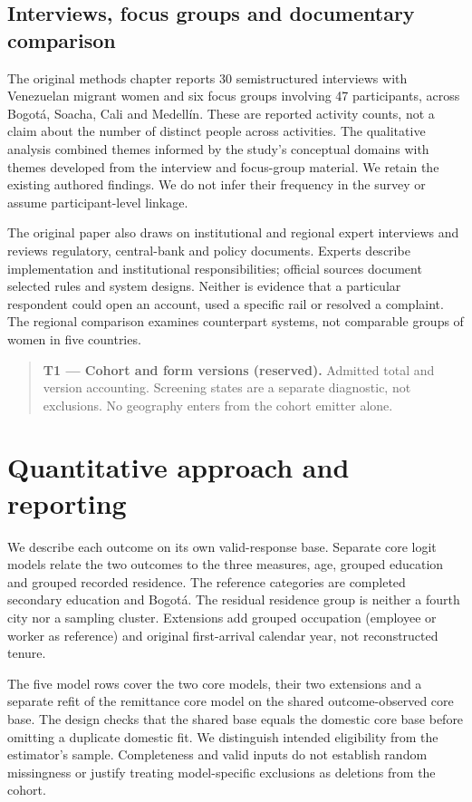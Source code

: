 \documentclass[12pt]{article}
\newcommand{\exhibitplaceholder}[3]{%
  \begin{quote}\small
    \textbf{#1 --- #2 (reserved).} #3
  \end{quote}%
}
\begin{document}
\subsection{Interviews, focus groups and documentary comparison}

The original methods chapter reports 30 semistructured interviews with Venezuelan migrant women and six focus groups involving 47 participants, across Bogotá, Soacha, Cali and Medellín. These are reported activity counts, not a claim about the number of distinct people across activities. The qualitative analysis combined themes informed by the study's conceptual domains with themes developed from the interview and focus-group material. We retain the existing authored findings. We do not infer their frequency in the survey or assume participant-level linkage.

The original paper also draws on institutional and regional expert interviews and reviews regulatory, central-bank and policy documents. Experts describe implementation and institutional responsibilities; official sources document selected rules and system designs. Neither is evidence that a particular respondent could open an account, used a specific rail or resolved a complaint. The regional comparison examines counterpart systems, not comparable groups of women in five countries.

\exhibitplaceholder{T1}{Cohort and form versions}{Admitted total and version accounting. Screening states are a separate diagnostic, not exclusions. No geography enters from the cohort emitter alone.}

\section{Quantitative approach and reporting}
We describe each outcome on its own valid-response base. Separate core logit models relate the two outcomes to the three measures, age, grouped education and grouped recorded residence. The reference categories are completed secondary education and Bogotá. The residual residence group is neither a fourth city nor a sampling cluster. Extensions add grouped occupation (employee or worker as reference) and original first-arrival calendar year, not reconstructed tenure.

The five model rows cover the two core models, their two extensions and a separate refit of the remittance core model on the shared outcome-observed core base. The design checks that the shared base equals the domestic core base before omitting a duplicate domestic fit. We distinguish intended eligibility from the estimator's sample. Completeness and valid inputs do not establish random missingness or justify treating model-specific exclusions as deletions from the cohort.
\end{document}
